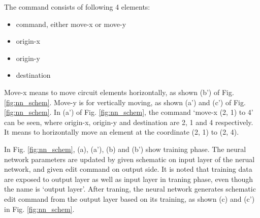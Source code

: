 \documentclass[twocolumn]{article}
\begin{document}
The command consists of following 4 elements:
\begin{itemize}
\item command, either move-x or move-y
\item origin-x
\item origin-y
\item destination
\end{itemize}
Move-x means to move circuit elements horizontally, as shown (b')
of Fig. \ref{fig:nn_schem}.
Move-y is for vertically moving, as shown (a') and (c')
of Fig. \ref{fig:nn_schem}.
In (a') of Fig. \ref{fig:nn_schem}, 
the command `move-x (2, 1) to 4' can be seen,
where origin-x, origin-y and destination are 2, 1 and 4 respectively.
It means to horizontally move an element at the coordinate (2, 1) to (2, 4).

In Fig. \ref{fig:nn_schem}, (a), (a'), (b) and (b') show training phase.
The neural network parameters are updated by given schematic on input layer
of the nerual network, and given edit command on output side.
It is noted that training data are exposed to output layer
as well as input layer in traning phase,
even though the name is `output layer'.
After traning, the neural network generates schematic edit command
from the output layer
based on its training, as shown (c) and (c') in Fig. \ref{fig:nn_schem}.
\end{document}
